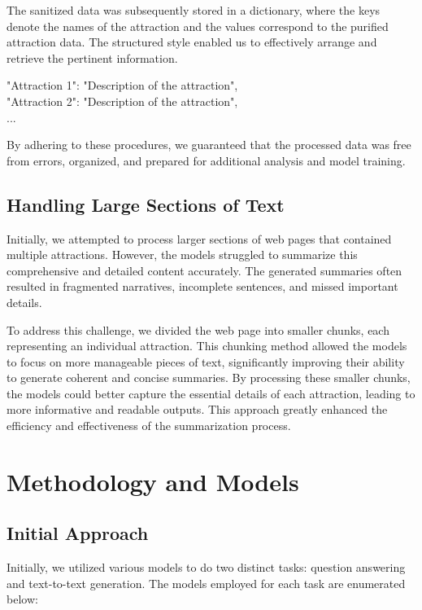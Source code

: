 \documentclass[conference]{IEEEtran}
\begin{document}
    The sanitized data was subsequently stored in a dictionary, where the keys denote the names of the attraction and the values correspond to the purified attraction data. The structured style enabled us to effectively arrange and retrieve the pertinent information.

\begin{mdframed}[linewidth=1pt, innerleftmargin=15pt, innerrightmargin=15pt, innertopmargin=15pt, innerbottommargin=15pt]
"Attraction 1": "Description of the attraction",\\
"Attraction 2": "Description of the attraction",\\
...
\end{mdframed}

    By adhering to these procedures, we guaranteed that the processed data was free from errors, organized, and prepared for additional analysis and model training.

    \subsection{Handling Large Sections of Text}
    Initially, we attempted to process larger sections of web pages that contained multiple attractions. However, the models struggled to summarize this comprehensive and detailed content accurately. The generated summaries often resulted in fragmented narratives, incomplete sentences, and missed important details.

    To address this challenge, we divided the web page into smaller chunks, each representing an individual attraction. This chunking method allowed the models to focus on more manageable pieces of text, significantly improving their ability to generate coherent and concise summaries. By processing these smaller chunks, the models could better capture the essential details of each attraction, leading to more informative and readable outputs. This approach greatly enhanced the efficiency and effectiveness of the summarization process.


\section{Methodology and Models}

    \subsection{Initial Approach}

        Initially, we utilized various models to do two distinct tasks: question answering and text-to-text generation. The models employed for each task are enumerated below:
\end{document}
